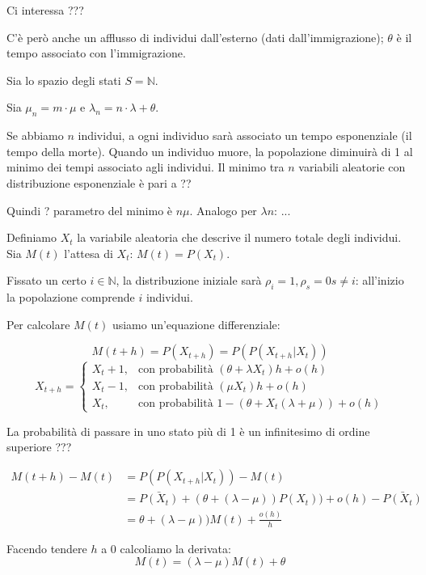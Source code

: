 \documentclass[a4paper,12pt]{book}
\begin{document}
Ci interessa ??? %

C'è però anche un afflusso di individui dall'esterno (dati dall'immigrazione); $\theta$ è il tempo associato con l'immigrazione. 

Sia lo spazio degli stati $ S = \mathbb{N} $. 

Sia $\mu_n = m\cdot \mu$ %
 e $\lambda_n = n\cdot \lambda + \theta$.
 
 Se abbiamo $ n $ individui, a ogni individuo sarà associato un tempo esponenziale (il tempo della morte). Quando un individuo muore, la popolazione diminuirà di 1 al minimo dei tempi associato agli individui. Il minimo tra $ n $ variabili aleatorie con distribuzione esponenziale è pari a ?? %
 
 Quindi ? %
 parametro del minimo è $ n\mu $. Analogo per $\lambda n$: ... %
 
 Definiamo $ X_t $ la variabile aleatoria che descrive il numero totale degli individui. Sia $ M(t) $ l'attesa di $ X_t $: $ M(t) = P(X_t) $.
 
 Fissato un certo $ i \in \mathbb{N} $, la distribuzione iniziale sarà $ \rho_i = 1, \rho_s = 0 s\ne i $: all'inizio la popolazione comprende $ i $ individui. 
 
 Per calcolare $ M(t) $ usiamo un'equazione differenziale:
 
	$$ M(t+h) = P(X_{t+h}) = P(P(X_{t+h} | X_t))$$
	$$ X_{t+h} = \begin{cases}
		X_t + 1, & \text{con probabilità } (\theta + \lambda X_t)h + o(h) \\
		X_t-1, & \text{con probabilità } (\mu X_t)h + o(h) \\
		X_t, & \text{con probabilità } 1 - (\theta + X_t(\lambda + \mu)) + o(h)
	\end{cases} $$ %
	
La probabilità di passare in uno stato più di 1 è un infinitesimo di ordine superiore ??? %

\begin{align*}
	M(t+h) - M(t) & = P(P(X_{t+h} | X_t )) - M(t) \\
	& = \bar{P(X_t)} + (\theta + (\lambda - \mu)) P(X_t)) + o(h) - \bar{P(X_t)} \\ %
	& = \theta + (\lambda - \mu)) M(t) + \frac{o(h)}{h} %
\end{align*}

Facendo tendere $ h $ a 0 calcoliamo la derivata:
$$ M(t) = (\lambda - \mu) M(t) + \theta $$
\end{document}
